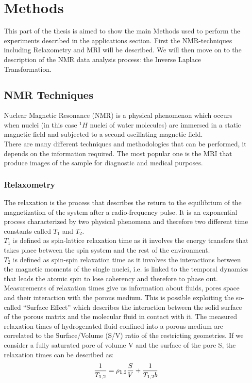 \documentclass[a4paper,11pt]{report}
\begin{document}
\chapter{Methods}

This part of the thesis is aimed to show the main  Methods used to perform the experiments described in the applications section. First the NMR-techniques including Relaxometry and MRI will be described. We will then move on to the description of the NMR data analysis process: the Inverse Laplace Transformation.

\section{NMR Techniques}
Nuclear Magnetic Resonance (NMR) is a physical phenomenon which occurs when nuclei (in this case $^1H$ nuclei of water molecules) are immersed in a static magnetic field and subjected to a second oscillating magnetic field. \\
There are many different techniques and methodologies that can be performed, it depends on the information required. The most popular one is the MRI that produce images of the sample for diagnostic and medical purposes.\\ 

\subsection{Relaxometry}
The relaxation is the process that describes the return to the equilibrium of the magnetization of the system after a radio-frequency pulse. It is an exponential process characterized by two physical phenomena and therefore two different time constants called $T_1$ and $T_2$. \\
$T_1$ is defined as spin-lattice relaxation time as it involves the energy transfers that takes place between the spin system and the rest of the environment.\\
$T_2$ is defined as spin-spin relaxation time as it involves the interactions between the magnetic moments of the single nuclei, i.e. is linked to the temporal dynamics that leads the atomic spin to lose coherency and therefore to phase out.\\
Measurements of relaxation times give us information about fluids, pores space and their interaction with the porous medium. This is possible exploiting the so-called “Surface Effect” which describes the interaction between the solid surface of the porous matrix and the molecular fluid in contact with it.  The measured relaxation times of hydrogenated fluid confined into a porous medium are correlated to the Surface/Volume (S/V) ratio of the restricting geometries. If we consider a fully saturated pore of volume V and the  surface of the pore S, the relaxation times can be described as:
\begin{equation} \label{surface effect}
	\large{\frac{1}{T_{1,2}}=\rho_{1,2}\frac{S}{V}+\frac{1}{T_{1,2}b}}
	\end{equation}
\end{document}
